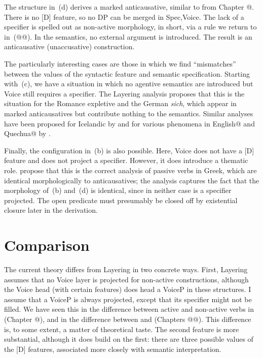 The structure in~(\lastx d) derives a marked anticausative, similar to {\tnif} from Chapter @. There is no [D] feature, so no DP can be merged in Spec,Voice. The lack of a specifier is spelled out as non-active morphology,  in short, via a rule we return to in~(@@). In the semantics, no external argument is introduced. The result is an anticausative (unaccusative) construction.

The particularly interesting cases are those in which we find ``mismatches'' between the values of the syntactic feature and semantic specification. Starting with~(\lastx c), we have a situation in which no agentive semantics are introduced but Voice still requires a specifier. The Layering analysis proposes that this is the situation for the Romance expletive  and the German \emph{sich}, which appear in marked anticausatives but contribute nothing to the semantics. Similar analyses have been proposed for Icelandic by \cite{wood14nllt,wood15springer} and for various phenomena in English@ and Quechua@ by \cite{myler16mit}.

Finally, the configuration in~(\lastx b) is also possible. Here, Voice does not have a [D] feature and does not project a specifier. However, it does introduce a thematic role. \cite{layering15} propose that this is the correct analysis of passive verbs in Greek, which are identical morphologically to anticausatives; the analysis captures the fact that the morphology of~(\lastx b) and~(\lastx d) is identical, since in neither case is a specifier projected. The open predicate must presumably be closed off by existential closure later in the derivation.


\section{Comparison}
The current theory differs from Layering in two concrete ways. First, Layering assumes that no Voice layer is projected for non-active constructions, although the Voice head (with certain features) does head a VoiceP in these structures. I assume that a VoiceP is always projected, except that its specifier might not be filled. We have seen this in the difference between active and non-active verbs in {\tkal} (Chapter @), and in the difference between {\vz} and {\vd} (Chapters @@). This difference is, to some extent, a matter of theoretical taste. The second feature is more substantial, although it does build on the first: there are three possible values of the [D] features, associated more closely with semantic interpretation.

